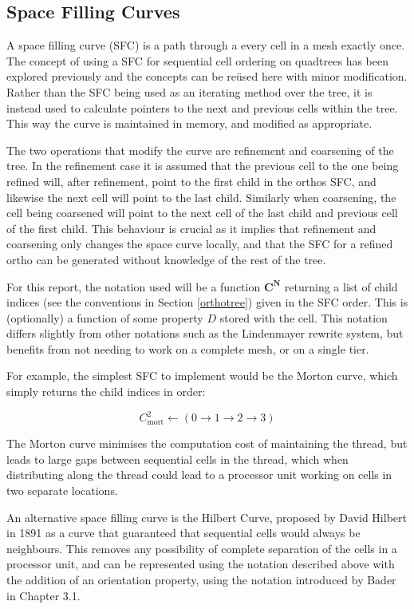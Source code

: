 \documentclass{IIBproject}
\newcommand{\vect}[1]{\bm{#1}}
\begin{document}
\subsection{Space Filling Curves}
A space filling curve (SFC) is a path through a every cell in a mesh exactly once. The concept of using a SFC for sequential cell ordering on quadtrees has been explored previously \cite{bader2013} and the concepts can be re\"used here with minor modification. Rather than the SFC being used as an iterating method over the tree, it is instead used to calculate pointers to the next and previous cells within the tree. This way the curve is maintained in memory, and modified as appropriate. 

The two operations that modify the curve are refinement and coarsening of the tree. In the refinement case it is assumed that the previous cell to the one being refined will, after refinement, point to the first child in the orthos SFC, and likewise the next cell will point to the last child. Similarly when coarsening, the cell being coarsened will point to the next cell of the last child and previous cell of the first child. This behaviour is crucial as it implies that refinement and coarsening only changes the space curve locally, and that the SFC for a refined ortho can be generated without knowledge of the rest of the tree.

For this report, the notation used will be a function $\vect{C^N}$ returning a list of child indices (see the conventions in Section \ref{orthotree}) given in the SFC order. This is (optionally) a function of some property $D$ stored with the cell. This notation differs slightly from other notations such as the Lindenmayer rewrite system, but benefits from not needing to work on a complete mesh, or on a single tier. 

For example, the simplest SFC to implement would be the Morton curve, which simply returns the child indices in order:

\begin{equation}
	C_{\mathrm{mort}}^2 \gets \left( 0 \to 1 \to 2 \to 3 \right)
\end{equation}

The Morton curve minimises the computation cost of maintaining the thread, but leads to large gaps between sequential cells in the thread, which when distributing along the thread could lead to a processor unit working on cells in two separate locations.

An alternative space filling curve is the Hilbert Curve, proposed by David Hilbert in 1891 as a curve that guaranteed that sequential cells would always be neighbours. This removes any possibility of complete separation of the cells in a processor unit, and can be represented using the notation described above with the addition of an orientation property, using the notation introduced by Bader \cite{bader2013} in Chapter 3.1. 
\end{document}
